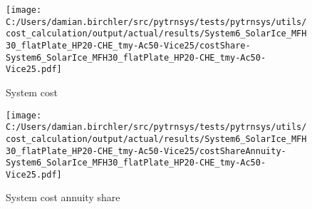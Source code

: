 \documentclass[english]{SPFShortReport}
\begin{document}
\begin{figure}[!htbp]
\begin{center}
\texttt{[image: C:/Users/damian.birchler/src/pytrnsys/tests/pytrnsys/utils/cost\_calculation/output/actual/results/System6\_SolarIce\_MFH30\_flatPlate\_HP20-CHE\_tmy-Ac50-Vice25/costShare-System6\_SolarIce\_MFH30\_flatPlate\_HP20-CHE\_tmy-Ac50-Vice25.pdf]}
\caption{System cost}
\label{systemCost}
\end{center}
\end{figure}
\begin{figure}[!htbp]
\begin{center}
\texttt{[image: C:/Users/damian.birchler/src/pytrnsys/tests/pytrnsys/utils/cost\_calculation/output/actual/results/System6\_SolarIce\_MFH30\_flatPlate\_HP20-CHE\_tmy-Ac50-Vice25/costShareAnnuity-System6\_SolarIce\_MFH30\_flatPlate\_HP20-CHE\_tmy-Ac50-Vice25.pdf]}
\caption{System cost annuity share}
\label{systemCostannuity}
\end{center}
\end{figure}
\end{document}
